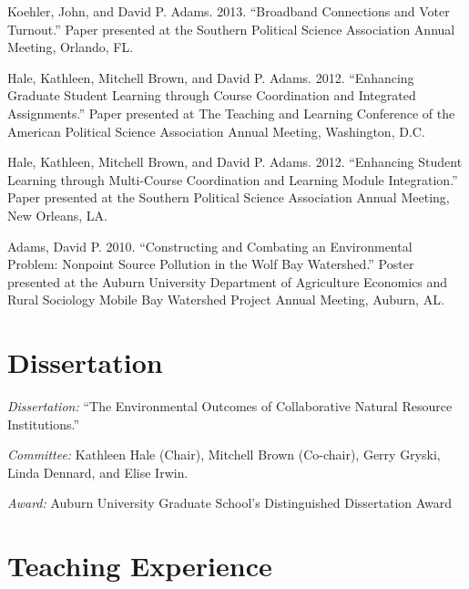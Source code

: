 \documentclass[12pt,letterpaper]{article}
\renewenvironment{itemize}{
  \begin{list}{}{
    \setlength{\leftmargin}{1.5em}
    \setlength{\itemsep}{0.25em}
    \setlength{\parskip}{0pt}
    \setlength{\parsep}{0.25em}
  }
}{
  \end{list}
}
\begin{document}
\begin{itemize}
    \item Koehler, John, and David P. Adams. 2013. ``Broadband Connections and Voter Turnout.'' Paper presented at the Southern Political Science Association Annual Meeting, Orlando, FL.
    
    \item Hale, Kathleen, Mitchell Brown, and David P. Adams. 2012. ``Enhancing Graduate Student Learning through Course Coordination and Integrated Assignments.'' Paper presented at The Teaching and Learning Conference of the American Political Science Association Annual Meeting, Washington, D.C.
    
    \item Hale, Kathleen, Mitchell Brown, and David P. Adams. 2012. ``Enhancing Student Learning through Multi-Course Coordination and Learning Module Integration.'' Paper presented at the Southern Political Science Association Annual Meeting, New Orleans, LA.
    
    \item Adams, David P. 2010. ``Constructing and Combating an Environmental Problem: Nonpoint Source Pollution in the Wolf Bay Watershed.'' Poster presented at the Auburn University Department of Agriculture Economics and Rural Sociology Mobile Bay Watershed Project Annual Meeting, Auburn, AL.
  \end{itemize}
  

\section*{Dissertation}
    \begin{itemize}\leftmargin=2pt\itemindent=-15pt\leftmargin=2pt\itemindent=-15pt
        \item \emph{Dissertation:} ``The Environmental Outcomes of Collaborative Natural Resource Institutions.'' 
        \item \emph{Committee:} Kathleen Hale (Chair), Mitchell Brown (Co-chair),
        Gerry Gryski, \\Linda Dennard, and Elise Irwin.
        \item \emph{Award:} Auburn University Graduate School's Distinguished Dissertation Award
    \end{itemize}
		
\section*{Teaching Experience}
\end{document}
